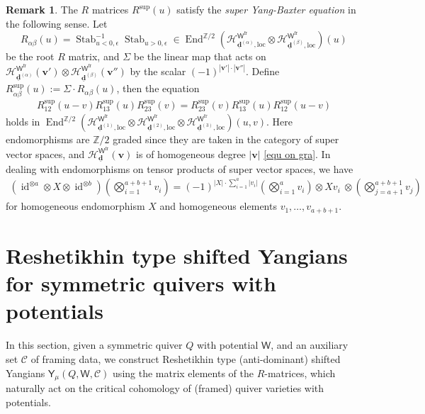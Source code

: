\documentclass[10pt]{amsart}
\theoremstyle{definition}
\newtheorem{Remark}[Theorem]{Remark}
\numberwithin{equation}{section}
\newcommand{\bZ}{\mathbb{Z}}
\newcommand{\bv}{\mathbf{v}}
\newcommand{\bd}{\mathbf{d}}
\newcommand{\cH}{\mathcal{H}}
\newcommand{\sW}{\mathsf{W}}
\newcommand{\End}{\operatorname{End}}
\newcommand{\Stab}{\operatorname{Stab}}
\newcommand{\id}{\operatorname{id}}
\begin{document}
\begin{Remark}\label{rmk super YBE}
The $R$ matrices $R^{\mathrm{sup}}(u)$ satisfy the \textit{super Yang-Baxter equation} in the following sense. Let 
$$R_{\alpha\beta}(u)=\Stab_{u<0,\epsilon}^{-1}\Stab_{u>0,\epsilon}\in \End^{\bZ/2}\left(\cH^{\sW^{\mathrm{fr}}}_{\underline{\bd}^{(\alpha)},\mathrm{loc}}\otimes \cH^{\sW^{\mathrm{fr}}}_{\underline{\bd}^{(\beta)},\mathrm{loc}}\right)(u)$$ be the root $R$ matrix, and $\Sigma$ be the linear map that acts on $\cH^{\sW^{\mathrm{fr}}}_{\underline{\bd}^{(\alpha)}}(\bv')\otimes \cH^{\sW^{\mathrm{fr}}}_{\underline{\bd}^{(\beta)}}(\bv'')$ by the scalar $(-1)^{|\bv'|\cdot |\bv''|}$. Define $R^{\mathrm{sup}}_{\alpha\beta}(u):=\Sigma\cdot R_{\alpha\beta}(u)$, then the equation
\begin{align}\label{super YBE}
R^{\mathrm{sup}}_{12}(u-v)R^{\mathrm{sup}}_{13}(u)R^{\mathrm{sup}}_{23}(v)=R^{\mathrm{sup}}_{23}(v)R^{\mathrm{sup}}_{13}(u)R^{\mathrm{sup}}_{12}(u-v)
\end{align}
holds in $\End^{\bZ/2}\left(\cH^{\sW^{\mathrm{fr}}}_{\underline{\bd}^{(1)},\mathrm{loc}}\otimes \cH^{\sW^{\mathrm{fr}}}_{\underline{\bd}^{(2)},\mathrm{loc}}\otimes \cH^{\sW^{\mathrm{fr}}}_{\underline{\bd}^{(3)},\mathrm{loc}}\right)(u,v)$. Here endomorphisms are $\bZ/2$ graded since they are taken in the category of super vector spaces, and $\cH^{\sW^{\mathrm{fr}}}_{\underline{\bd}}(\bv)$ is of homogeneous degree $|\bv|$ \eqref{equ on gra}. In dealing with endomorphisms on tensor products of super vector spaces, we have 
\begin{align*}
    \left(\id^{\otimes a}\otimes X\otimes \id^{\otimes b}\right)\left(\bigotimes_{i=1}^{a+b+1}v_i\right)=(-1)^{|X|\cdot\sum_{i=1}^a|v_i|}\left(\bigotimes_{i=1}^{a}v_i\right)\otimes Xv_i\:\otimes \left(\bigotimes_{j=a+1}^{a+b+1}v_j\right)
\end{align*}
for homogeneous endomorphism $X$ and homogeneous elements $v_1,\ldots,v_{a+b+1}$.
\end{Remark}


\section{Reshetikhin type shifted Yangians for symmetric quivers with potentials}\label{sec shifted Yangian}


In this section, given a symmetric quiver $Q$ with potential $\sW$, and an auxiliary set $\mathcal C$ of framing data, we construct Reshetikhin type (anti-dominant) shifted  Yangians 
$\mathsf Y_\mu(Q,\sW,\mathcal C)$ using the matrix elements of the $R$-matrices, which naturally act on the critical cohomology of (framed) quiver varieties with potentials. 
\end{document}
